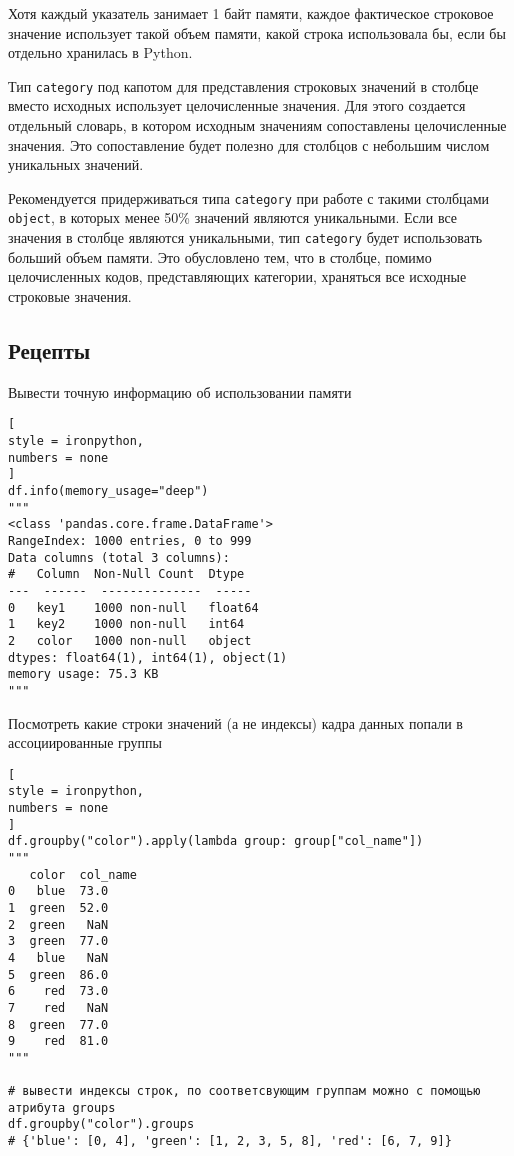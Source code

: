 \documentclass[%
	11pt,
	a4paper,
	utf8,
		]{article}
\begin{document}
Хотя каждый указатель занимает 1 байт памяти, каждое фактическое строковое значение использует такой объем памяти, какой строка использовала бы, если бы отдельно хранилась в Python.

Тип \texttt{category} под капотом для представления строковых значений в столбце вместо исходных использует целочисленные значения. Для этого создается отдельный словарь, в котором исходным значениям сопоставлены целочисленные значения. Это сопоставление будет полезно для столбцов с небольшим числом уникальных значений.

Рекомендуется придерживаться типа \texttt{category} при работе с такими столбцами \texttt{object}, в которых менее 50\% значений являются уникальными. Если все значения в столбце являются уникальными, тип \texttt{category} будет использовать б\emph{о}льший объем памяти. Это обусловлено тем, что в столбце, помимо целочисленных кодов, представляющих категории, храняться все исходные строковые значения.


\subsection{Рецепты}

Вывести точную информацию об использовании памяти
\begin{lstlisting}[
style = ironpython,
numbers = none	
]
df.info(memory_usage="deep")
"""
<class 'pandas.core.frame.DataFrame'>
RangeIndex: 1000 entries, 0 to 999
Data columns (total 3 columns):
#   Column  Non-Null Count  Dtype
---  ------  --------------  -----
0   key1    1000 non-null   float64
1   key2    1000 non-null   int64
2   color   1000 non-null   object
dtypes: float64(1), int64(1), object(1)
memory usage: 75.3 KB
"""
\end{lstlisting}

Посмотреть какие строки значений (а не индексы) кадра данных попали в ассоциированные группы
\begin{lstlisting}[
style = ironpython,
numbers = none
]
df.groupby("color").apply(lambda group: group["col_name"])
"""
   color  col_name
0   blue  73.0
1  green  52.0
2  green   NaN
3  green  77.0
4   blue   NaN
5  green  86.0
6    red  73.0
7    red   NaN
8  green  77.0
9    red  81.0
"""

# вывести индексы строк, по соответсвующим группам можно с помощью атрибута groups
df.groupby("color").groups
# {'blue': [0, 4], 'green': [1, 2, 3, 5, 8], 'red': [6, 7, 9]}
\end{lstlisting}
\end{document}
